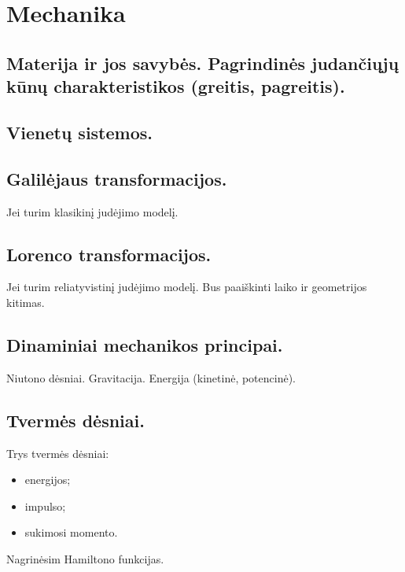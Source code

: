 \chapter{Mechanika}

\section{Materija ir jos savybės. Pagrindinės judančiųjų kūnų charakteristikos (greitis, pagreitis).}
\section{Vienetų sistemos.}
\section{Galilėjaus transformacijos.}

Jei turim klasikinį judėjimo modelį.

\section{Lorenco transformacijos.}

Jei turim reliatyvistinį judėjimo modelį. Bus paaiškinti laiko ir
geometrijos kitimas.

\section{Dinaminiai mechanikos principai.}
Niutono dėsniai. Gravitacija. Energija (kinetinė, potencinė).
\section{Tvermės dėsniai.}
Trys tvermės dėsniai:
\begin{itemize}
  \item energijos;
  \item impulso;
  \item sukimosi momento.
\end{itemize}

Nagrinėsim Hamiltono funkcijas.
